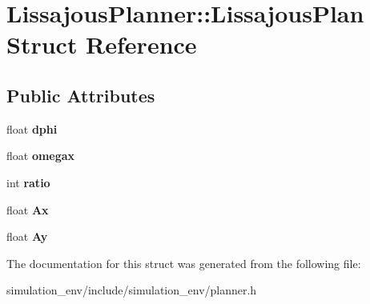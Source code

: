 \hypertarget{structLissajousPlanner_1_1LissajousPlan}{}\section{Lissajous\+Planner\+:\+:Lissajous\+Plan Struct Reference}
\label{structLissajousPlanner_1_1LissajousPlan}
\subsection*{Public Attributes}
\begin{DoxyCompactItemize}
\item 
float {\bfseries dphi}\hypertarget{structLissajousPlanner_1_1LissajousPlan_a60c6081d5506c1be5e0c4b48d5980b8d}{}\label{structLissajousPlanner_1_1LissajousPlan_a60c6081d5506c1be5e0c4b48d5980b8d}

\item 
float {\bfseries omegax}\hypertarget{structLissajousPlanner_1_1LissajousPlan_a54e05e3d4666b9843c13afe751d868e6}{}\label{structLissajousPlanner_1_1LissajousPlan_a54e05e3d4666b9843c13afe751d868e6}

\item 
int {\bfseries ratio}\hypertarget{structLissajousPlanner_1_1LissajousPlan_a1d7a8cb09570d913576d0b3592674e1f}{}\label{structLissajousPlanner_1_1LissajousPlan_a1d7a8cb09570d913576d0b3592674e1f}

\item 
float {\bfseries Ax}\hypertarget{structLissajousPlanner_1_1LissajousPlan_a85bedcfba3d78cb16bd67cc402b674ef}{}\label{structLissajousPlanner_1_1LissajousPlan_a85bedcfba3d78cb16bd67cc402b674ef}

\item 
float {\bfseries Ay}\hypertarget{structLissajousPlanner_1_1LissajousPlan_a72082318cebb55674e68a3383a81721f}{}\label{structLissajousPlanner_1_1LissajousPlan_a72082318cebb55674e68a3383a81721f}

\end{DoxyCompactItemize}


The documentation for this struct was generated from the following file\+:\begin{DoxyCompactItemize}
\item 
simulation\+\_\+env/include/simulation\+\_\+env/planner.\+h\end{DoxyCompactItemize}
